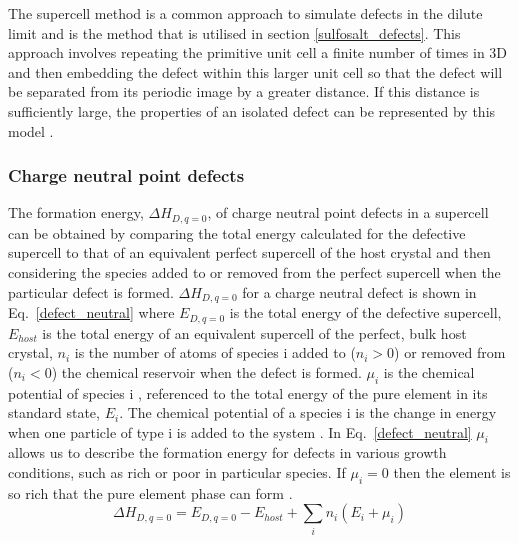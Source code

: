 \documentclass[11pt, twoside]{report}
\begin{document}
The supercell method is a common approach to simulate defects in the dilute limit and is the method that is utilised in section \ref{sulfosalt_defects}. This approach involves repeating the primitive unit cell a finite number of times in 3D and then embedding the defect within this larger unit cell so that the defect will be separated from its periodic image by a greater distance. If this distance is sufficiently large, the properties of an isolated defect can be represented by this model \cite{freysoldt_rev}.

\subsubsection{Charge neutral point defects}
The formation energy, $\Delta H_{D,q=0}$, of charge neutral point defects in a supercell can be obtained by comparing the total energy calculated for the defective supercell to that of an equivalent perfect supercell of the host crystal and then considering the species added to or removed from the perfect supercell when the particular defect is formed. $\Delta H_{D,q=0}$ for a charge neutral defect is shown in Eq.~\ref{defect_neutral} where $E_{D,q=0}$ is the total energy of the defective supercell, $E_{host}$ is the total energy of an equivalent supercell of the perfect, bulk host crystal, $n_i$ is the number of atoms of species i added to ($n_i > 0 $) or removed from ($n_i < 0$) the chemical reservoir when the defect is formed. $\mu_i$ is the chemical potential of species i \cite{ZhangNorthup_defect_formation}, referenced to the total energy of the pure element in its standard state, $E_i$. The chemical potential of a species i is the change in energy when one particle of type i is added to the system \cite{chem_pot}. In Eq.~\ref{defect_neutral} $\mu_i$ allows us to describe the formation energy for defects in various growth conditions, such as rich or poor in particular species. If $\mu_i = 0$ then the element is so rich that the pure element phase can form \cite{defects_Chen}.
\begin{equation}\label{defect_neutral}
\Delta H_{D,q=0} = E_{D,q=0} - E_{host} + \sum_i n_i (E_i + \mu_i )
\end{equation}
\end{document}
